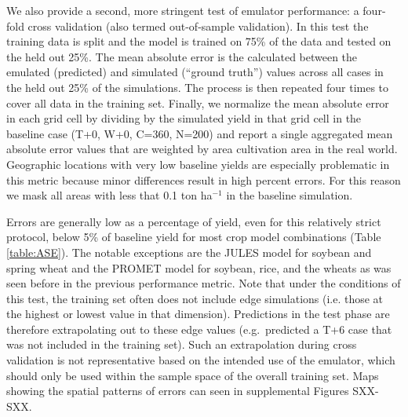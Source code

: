\documentclass[gmd, manuscript]{copernicus} %
\begin{document}
We also provide a second, more stringent test of emulator performance: a four-fold cross validation (also termed out-of-sample validation). 
In this test the training data is split and the model is trained on 75\% of the data and tested on the held out 25\%.
The mean absolute error is the calculated between the emulated (predicted) and simulated (``ground truth'') values across all cases in the held out 25\% of the simulations. 
The process is then repeated four times to cover all data in the training set. 
Finally, we normalize the mean absolute error in each grid cell by dividing by the simulated yield in that grid cell in the baseline case (T+0, W+0, C=360, N=200) and report a single aggregated mean absolute error values that are weighted by area cultivation area in the real world. 
Geographic locations with very low baseline yields are especially problematic in this metric because minor differences result in high percent errors. 
For this reason we mask all areas with less that 0.1 ton ha$^{-1}$ in the baseline simulation. 

Errors are generally low as a percentage of yield, even for this relatively strict protocol, below 5\% of baseline yield for most crop model combinations (Table \ref{table:ASE}).
The notable exceptions are the JULES model for soybean and spring wheat and the PROMET model for soybean, rice, and the wheats as was seen before in the previous performance metric.
Note that under the conditions of this test, the training set often does not include edge simulations (i.e. those at the highest or lowest value in that dimension).
Predictions in the test phase are therefore extrapolating out to these edge values (e.g.\ predicted a T+6 case that was not included in the training set).
Such an extrapolation during cross validation is not representative based on the intended use of the emulator, which should only be used within the sample space of the overall training set.
Maps showing the spatial patterns of errors can seen in supplemental Figures SXX-SXX. 

\end{document}
